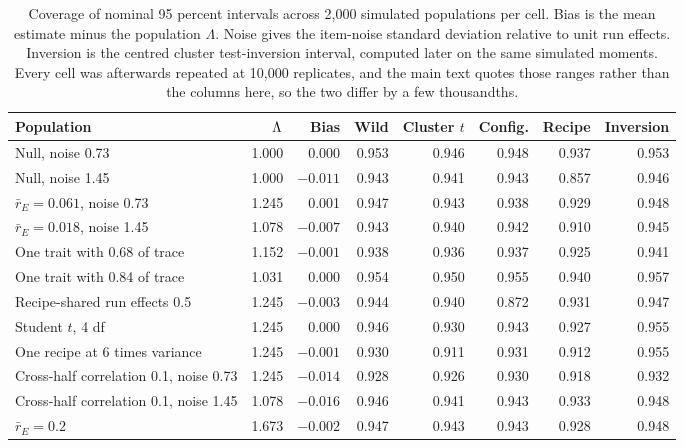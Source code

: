 \begin{table}[!htb]
\centering
\caption{Coverage of nominal 95 percent intervals across 2,000 simulated populations per cell. Bias is the mean estimate minus the population $\Lambda$. Noise gives the item-noise standard deviation relative to unit run effects. Inversion is the centred cluster test-inversion interval, computed later on the same simulated moments. Every cell was afterwards repeated at 10,000 replicates, and the main text quotes those ranges rather than the columns here, so the two differ by a few thousandths.}
\label{tab:coverage}
\small\setlength{\tabcolsep}{4pt}\renewcommand{\arraystretch}{1.1}
\begin{tabular}{lrrrrrrr}
\toprule
Population & $\Lambda$ & Bias & Wild & Cluster $t$ & Config. & Recipe & Inversion\\
\midrule
Null, noise 0.73 & 1.000 & 0.000 & 0.953 & 0.946 & 0.948 & 0.937 & 0.953\\
Null, noise 1.45 & 1.000 & $-0.011$ & 0.943 & 0.941 & 0.943 & 0.857 & 0.946\\
$\bar r_E=0.061$, noise 0.73 & 1.245 & 0.001 & 0.947 & 0.943 & 0.938 & 0.929 & 0.948\\
$\bar r_E=0.018$, noise 1.45 & 1.078 & $-0.007$ & 0.943 & 0.940 & 0.942 & 0.910 & 0.945\\
One trait with 0.68 of trace & 1.152 & $-0.001$ & 0.938 & 0.936 & 0.937 & 0.925 & 0.941\\
One trait with 0.84 of trace & 1.031 & 0.000 & 0.954 & 0.950 & 0.955 & 0.940 & 0.957\\
Recipe-shared run effects 0.5 & 1.245 & $-0.003$ & 0.944 & 0.940 & 0.872 & 0.931 & 0.947\\
Student $t$, 4 df & 1.245 & 0.000 & 0.946 & 0.930 & 0.943 & 0.927 & 0.955\\
One recipe at 6 times variance & 1.245 & $-0.001$ & 0.930 & 0.911 & 0.931 & 0.912 & 0.955\\
Cross-half correlation 0.1, noise 0.73 & 1.245 & $-0.014$ & 0.928 & 0.926 & 0.930 & 0.918 & 0.932\\
Cross-half correlation 0.1, noise 1.45 & 1.078 & $-0.016$ & 0.946 & 0.941 & 0.943 & 0.933 & 0.948\\
$\bar r_E=0.2$ & 1.673 & $-0.002$ & 0.947 & 0.943 & 0.943 & 0.928 & 0.948\\
\bottomrule
\end{tabular}
\end{table}

